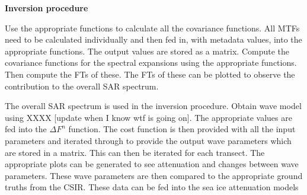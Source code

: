 \textbf{Inversion procedure}

Use the appropriate functions to calculate all the covariance functions. All MTFs need to be calculated individually and then fed in, with metadata values, into the appropriate functions. The output values are stored as a matrix. Compute the covariance functions for the spectral expansions using the appropriate functions. Then compute the FTs of these. The FTs of these can be plotted to observe the contribution to the overall SAR spectrum. 

The overall SAR spectrum is used in the inversion procedure. Obtain wave model using XXXX [update when I know wtf is going on]. The appropriate values are fed into the $\Delta F^n$ function. The cost function is then provided with all the input parameters and iterated through to provide the output wave parameters which are stored in a matrix. This can then be iterated for each transect. The appropriate plots can be generated to see attenuation and changes between wave parameters. These wave parameters are then compared to the appropriate ground truths from the CSIR. These data can be fed into the sea ice attenuation models 






